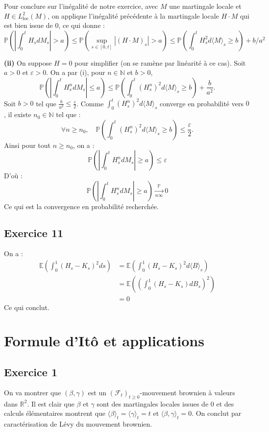 \documentclass[a4paper,12pt]{article}
\newcommand{\E}{\mathbb{E}}
\newcommand{\prob}{\mathbb{P}}
\newcommand{\f}{\mathcal{F}}
\begin{document}
Pour conclure sur l'inégalité de notre exercice, avec $M$ une martingale locale et $H \in L^2_{\text{loc}} (M)$, on applique l'inégalité précédente à la martingale locale $H \cdot M$ qui est bien issue de 0, ce qui donne :
$$\prob \left( \left| \int_0^t H_s dM_s \right| > a \right) \leq \prob \left( \sup_{s \in [0,t]} \left| (H \cdot M)_s \right| > a \right) \leq \prob \left( \int_0^t H_s^2 d \langle M \rangle_s \geq b \right) + b/a^2$$

\textbf{(ii)} On suppose $H=0$ pour simplifier (on se ramène par linéarité à ce cas). Soit $a>0$ et $\varepsilon >0$. On a par (i), pour $n \in \mathbb{N}$ et $b>0$,  
\[
\mathbb{P} \left( \left| \int_0^t H^n_s dM_s \right| \leq a \right)  
\leq \mathbb{P} \left( \int_0^t (H^n_s)^2 d \langle M \rangle_s \geq b \right) + \frac{b}{a^2}.
\]
Soit $b >0$ tel que $\frac{b}{a^2} \leq \frac{\varepsilon}{2}$. Comme $\int_0^t (H^n_s)^2 d \langle M \rangle_s$ converge en probabilité vers $0$, il existe $n_0 \in \mathbb{N}$ tel que :
\[
\forall n \geq n_0, \quad \mathbb{P} \left( \int_0^t (H^n_s)^2 d \langle M \rangle_s \geq b \right) \leq \frac{\varepsilon}{2}.
\]
Ainsi pour tout $n \geq n_0$, on a :
$$ \prob \left( \left| \int_{0}^t H_s^n dM_s \right| \geq a \right) \leq \varepsilon $$
D'où :
$$ \prob \left( \left| \int_{0}^t H_s^n dM_s \right| \geq a \right) \xrightarrow[n \infty]{\prob} 0$$
Ce qui est la convergence en probabilité recherchée. \\

\subsection{Exercice 11} 
On a :
\begin{align*}
\E \left( \int_0^1 (H_s-K_s)^2 ds \right) & = \E \left( \int_0^1 (H_s-K_s)^2 d \langle B \rangle_s \right) \\
& = \E \left( \left( \int_0^1 (H_s-K_s) dB_s \right)^2 \right) \\
& = 0
\end{align*}
Ce qui conclut. \\

\section{Formule d'Itô et applications}

\subsection{Exercice 1}
On va montrer que $(\beta, \gamma)$ est un $(\f_t)_{t \geq 0}$-mouvement brownien à valeurs dans $\mathbb{R}^2$. Il est clair que $\beta$ et $\gamma$ sont des martingales locales issues de $0$ et des calculs élémentaires montrent que $\langle \beta \rangle_t = \langle \gamma \rangle_t = t$ et $\langle \beta, \gamma \rangle_t =0$. On conclut par caractérisation de Lévy du mouvement brownien.
\end{document}
